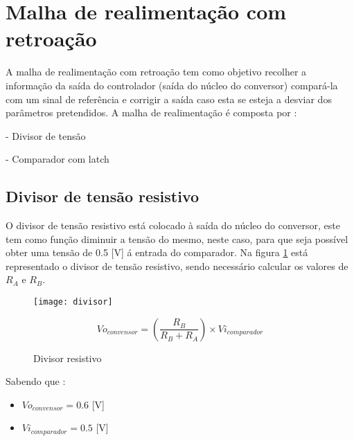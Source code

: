 \documentclass[12pt]{article}
\begin{document}
\section{Malha de realimentação com retroação}

A malha de realimentação com retroação tem como objetivo recolher a informação da saída do controlador (saída do núcleo do conversor) compará-la com um sinal de referência e corrigir a saída caso esta se esteja a desviar dos parâmetros pretendidos.
A malha de realimentação é composta por :
\vspace*{5mm}

- Divisor de tensão

- Comparador com latch                                                                                                   

\subsection{Divisor de tensão resistivo}

O divisor de tensão resistivo está colocado à saída do núcleo do conversor, este tem como função diminuir a tensão do mesmo, neste caso, para que seja possível obter uma tensão de 0.5 [V] á entrada do comparador.
Na figura \ref{fig:divisor} está representado o divisor  de tensão resistivo, sendo necessário calcular os valores de $R_A$ e $R_B$. 
\vspace*{5mm}


\begin{figure}[htbp]
	\centering
	\begin{minipage}{.5\textwidth}
		\centering
		\texttt{[image: divisor]}
	\caption{Divisor resistivo}
	\label{fig:divisor}
	\end{minipage}%
	\begin{minipage}{.5\textwidth}
		\centering
		{\footnotesize \begin{equation}
			\label{eq:divisorres}
			 V{o_{convensor}} =(\frac{R_B}{R_B + R_A})\times V{i_{comparador}}
		\end{equation}} 
	\end{minipage}
\end{figure}

Sabendo que :
\begin{itemize}
\item \begin{center} $V{o_{convensor}} = 0.6$ [V] \end{center}
\item \begin{center} $V{i_{comparador}} = 0.5$ [V] \end{center}
\end{itemize}
\vspace*{5mm}
\end{document}
